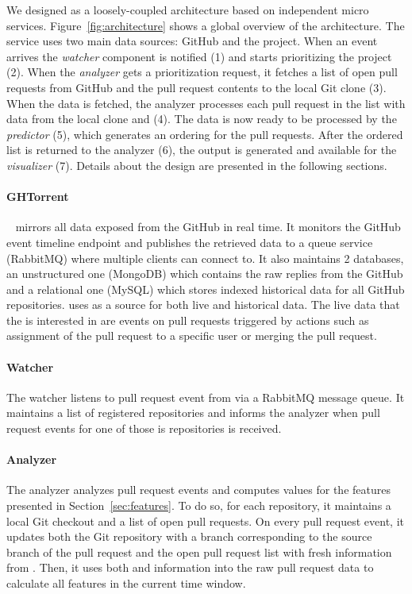 \documentclass[conference]{IEEEtran}
\begin{document}
We designed \prioritizer as a loosely-coupled architecture based on independent
micro services. Figure~\ref{fig:architecture} shows a global overview of the
architecture.  The \prioritizer service uses two main data sources: GitHub and
the \ghtorrent project.  When an event arrives the \emph{watcher} component is
notified (1) and starts prioritizing the project (2).  When the \emph{analyzer}
gets a prioritization request, it fetches a list of open pull requests from
GitHub and the pull request contents to the local Git clone (3).  When the data
is fetched, the analyzer processes each pull request in the list with data from the local
clone and \ghtorrent (4).  The data is now ready to be processed by the
\emph{predictor} (5), which generates an ordering for the pull requests.  After
the ordered list is returned to the analyzer (6), the output is generated and
available for the \emph{visualizer} (7).  Details about the design are presented 
in the following sections.

\paragraph{GHTorrent}
\ghtorrent~\cite{G13} mirrors all data exposed from the GitHub \api in
real time. It monitors the GitHub event timeline \api endpoint and publishes the 
retrieved data to a queue service (RabbitMQ) where multiple clients can connect to. 
It also maintains 2 databases, an unstructured one (MongoDB)
which contains the raw replies from the GitHub \api and a relational one
(MySQL) which stores indexed historical data for all GitHub repositories.
\prioritizer uses \ghtorrent as a source for both live and historical data. The live data
that the \prioritizer is interested in are events on pull requests triggered by actions 
such as assignment of the pull request to a specific user or merging the pull request.

\paragraph{Watcher}
The watcher listens to pull request event from \ghtorrent
via a RabbitMQ message queue. It maintains a list of registered repositories
and informs the analyzer when pull request events for one of those is
repositories is received.

\paragraph{Analyzer}
The analyzer analyzes pull request events and computes values for
the features presented in Section~\ref{sec:features}. To do so, for each repository,
it maintains a local Git checkout and a list of open pull requests.
On every pull request event, it updates both the Git repository with
a branch corresponding to the source branch of the pull request
and the open pull request list with fresh information from \ghtorrent.
Then, it uses both \ghtorrent and information into the raw pull request
data to calculate all features in the current time window.
\end{document}
